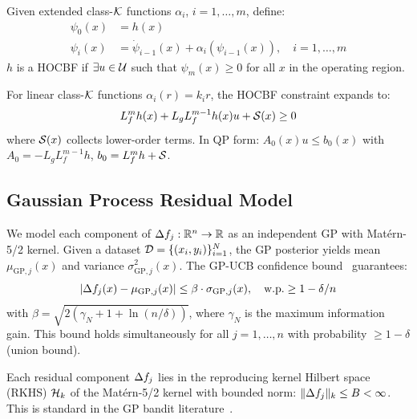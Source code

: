 \begin{definition}[HOCBF]
\label{def:hocbf}
Given extended class-$\mathcal{K}$ functions $\alpha_i$, $i = 1, \ldots, m$, define:
\begin{align}
    \psi_0(x) &= h(x) \label{eq:psi0} \\
    \psi_i(x) &= \dot{\psi}_{i-1}(x) + \alpha_i(\psi_{i-1}(x)), \quad i = 1, \ldots, m \label{eq:psi_chain}
\end{align}
$h$ is a HOCBF if $\exists u \in \mathcal{U}$ such that $\psi_m(x) \geq 0$ for all $x$ in the operating region.
\end{definition}

For linear class-$\mathcal{K}$ functions $\alpha_i(r) = k_i r$, the HOCBF constraint expands to:
\begin{equation}
    L_f^m h(x) + L_g L_f^{m-1} h(x) u + \mathcal{S}(x) \geq 0
    \label{eq:hocbf_constraint}
\end{equation}
where $\mathcal{S}(x)$ collects lower-order terms. In QP form: $A_0(x) u \leq b_0(x)$ with $A_0 = -L_g L_f^{m-1} h$, $b_0 = L_f^m h + \mathcal{S}$.

\subsection{Gaussian Process Residual Model}

We model each component of $\Delta f_j: \mathbb{R}^n \to \mathbb{R}$ as an independent GP with Mat\'{e}rn-5/2 kernel. Given a dataset $\mathcal{D} = \{(x_i, y_i)\}_{i=1}^N$, the GP posterior yields mean $\mu_{\mathrm{GP},j}(x)$ and variance $\sigma_{\mathrm{GP},j}^2(x)$. The GP-UCB confidence bound~\cite{srinivas2010gp} guarantees:
\begin{equation}
    |\Delta f_j(x) - \mu_{\mathrm{GP},j}(x)| \leq \beta \cdot \sigma_{\mathrm{GP},j}(x), \quad \text{w.p.} \geq 1 - \delta/n
    \label{eq:gp_bound}
\end{equation}
with $\beta = \sqrt{2(\gamma_N + 1 + \ln(n/\delta))}$, where $\gamma_N$ is the maximum information gain. This bound holds simultaneously for all $j = 1, \ldots, n$ with probability $\geq 1 - \delta$ (union bound).

\begin{assumption}
\label{asm:rkhs}
Each residual component $\Delta f_j$ lies in the reproducing kernel Hilbert space (RKHS) $\mathcal{H}_k$ of the Mat\'{e}rn-5/2 kernel with bounded norm: $\|\Delta f_j\|_k \leq B < \infty$. This is standard in the GP bandit literature~\cite{srinivas2010gp}.
\end{assumption}

